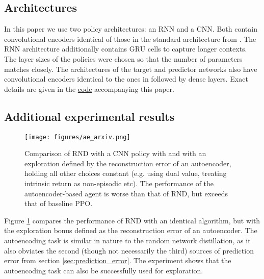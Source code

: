 \documentclass{article} \usepackage[dvipsnames]{xcolor}
\begin{document}
\subsection{Architectures}
In this paper we use two policy architectures: an RNN and a CNN. Both contain convolutional encoders identical of those in the standard architecture from \citep{dqn}. The RNN architecture additionally contains GRU \citep{cho2014learning} cells to capture longer contexts. The layer sizes of the policies were chosen so that the number of parameters matches closely. The architectures of the target and predictor networks also have convolutional encoders identical to the ones in \citep{dqn} followed by dense layers. Exact details are given in the \href{https://github.com/openai/random-network-distillation}{code} accompanying this paper.
\subsection{Additional experimental results}
\label{sec:additional_results}


\begin{figure}[htbp]
\centering
\hspace{.02\textwidth}
\begin{minipage}[t]{0.98\linewidth}
\centering
\texttt{[image: figures/ae\_arxiv.png]}
\end{minipage}\par
\vspace*{-5pt}
\hspace{.02\textwidth}
\begin{minipage}[t]{0.98\linewidth}
\caption{Comparison of RND with a CNN policy with  and  with an exploration defined by the reconstruction error of an autoencoder, holding all other choices constant (e.g. using dual value, treating intrinsic return as non-episodic etc). The performance of the autoencoder-based agent is worse than that of RND, but exceeds that of baseline PPO.}
\label{fig:ae}
\end{minipage}\vspace*{-20pt}
\end{figure}



Figure \ref{fig:ae} compares the performance of RND with an identical algorithm, but with the exploration bonus defined as the reconstruction error of an autoencoder. The autoencoding task is similar in nature to the random network distillation, as it also obviates the second (though not necessarily the third) sources of prediction error from section \ref{sec:prediction_error}. The experiment shows that the autoencoding task can also be successfully used for exploration.
\end{document}
